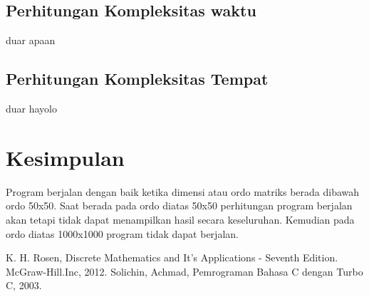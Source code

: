 \documentclass[conference]{IEEEtran}
\begin{document}
\subsection{Perhitungan Kompleksitas waktu}
duar apaan

\subsection{Perhitungan Kompleksitas Tempat}
duar hayolo

\section{Kesimpulan}
Program berjalan dengan baik ketika dimensi atau ordo matriks berada dibawah ordo 50x50. Saat berada pada ordo diatas 50x50 perhitungan program berjalan akan tetapi tidak dapat menampilkan hasil secara keseluruhan. Kemudian pada ordo diatas 1000x1000 program tidak dapat berjalan.

\begin{thebibliography}{00}
     K. H. Rosen, Discrete Mathematics and It’s Applications - Seventh
    Edition. McGraw-Hill.Inc, 2012.
     Solichin, Achmad, Pemrograman Bahasa C dengan Turbo C, 2003.
    \end{thebibliography}
\end{document}
